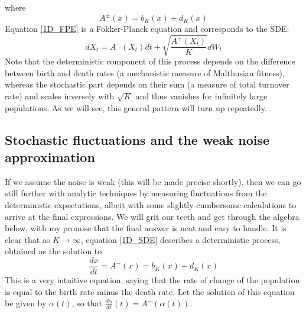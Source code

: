 where
\begin{equation*}
	A^{\pm}(x) = b_K(x) \pm d_K(x)
\end{equation*}
Equation \eqref{1D_FPE} is a Fokker-Planck equation and corresponds to the SDE:
\begin{equation}
	\label{1D_SDE}
	dX_t = A^{-}(X_t)dt + \sqrt{\frac{A^{+}(X_t)}{K}}dW_t
\end{equation}
Note that the deterministic component of this process depends on the difference between birth and death rates (a mechanistic measure of Malthusian fitness), whereas the stochastic part depends on their sum (a measure of total turnover rate) and scales inversely with $\sqrt{K}$ and thus vanishes for infinitely large populations. As we will see, this general pattern will turn up repeatedly.

\subsection{Stochastic fluctuations and the weak noise approximation}\label{sec_1D_WNA}
If we assume the noise is weak (this will be made precise shortly), then we can go still further with analytic techniques by measuring fluctuations from the deterministic expectations, albeit with some slightly cumbersome calculations to arrive at the final expressions. We will grit our teeth and get through the algebra below, with my promise that the final answer is neat and easy to handle. It is clear that as $K \to \infty$, equation \eqref{1D_SDE} describes a deterministic process, obtained as the solution to
\begin{equation}
	\label{1D_det_limit}
	\frac{dx}{dt} = A^{-}(x) = b_{K}(x) - d_{K}(x)
\end{equation}
This is a very intuitive equation, saying that the rate of change of the population is equal to the birth rate minus the death rate. Let the solution of this equation  be given by $\alpha(t)$, so that $\frac{d{\alpha}}{dt}(t) = A^{-}(\alpha(t))$.

